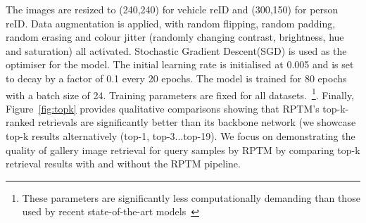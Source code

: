 \documentclass[10pt,twocolumn,letterpaper]{article}
\begin{document}
The images are resized to (240,240) for vehicle reID and (300,150) for person reID.
Data augmentation is applied,  with random flipping, random padding, random erasing and colour jitter (randomly changing contrast, brightness, hue and saturation) all  activated.  
 Stochastic Gradient Descent(SGD) is used as the optimiser for the model. The initial learning rate is initialised at 0.005 and is  set to  decay by a factor of 0.1 every 20 epochs.
 The model is trained for 80 epochs with a batch size of 24.
 Training parameters are fixed for all datasets.~\footnote{
 These 
parameters are significantly less computationally demanding  than those used by recent state-of-the-art models~\cite{Fu_2022_CVPR,he2021transreid,rao2021counterfactual,wang2022nformer,zhu2022dual}}.
Finally,  Figure~\ref{fig:topk} provides qualitative comparisons showing that RPTM's top-k-ranked retrievals are significantly better than its backbone network (we showcase top-k results alternatively (top-1, top-3...top-19). We focus on demonstrating the quality of gallery image retrieval for query samples by RPTM by comparing top-k retrieval results with and without the RPTM pipeline.
\end{document}
